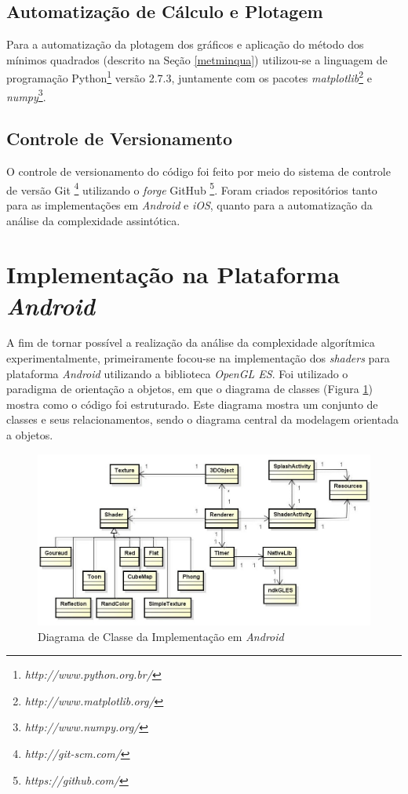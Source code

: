 \subsection{Automatização de Cálculo e Plotagem}

	Para a automatização da plotagem dos gráficos e aplicação do método dos mínimos quadrados (descrito na Seção \ref{metminqua}) utilizou-se a linguagem de programação Python\footnote{\textit{http://www.python.org.br/}} versão 2.7.3, juntamente com os pacotes  \textit{matplotlib}\footnote{\textit{http://www.matplotlib.org/}} e  \textit{numpy}\footnote{\textit{http://www.numpy.org/}}. 

\subsection{Controle de Versionamento}

	O controle de versionamento do código foi feito por meio do sistema de controle de versão Git \footnote{\textit{http://git-scm.com/}} utilizando o \textit{forge} GitHub \footnote{\textit{https://github.com/}}. Foram criados repositórios tanto para as implementações em \textit{Android} e \textit{iOS}, quanto para a automatização da análise da complexidade assintótica.

\section{Implementação na Plataforma \textit{Android}} 
\label{imp}

	 A fim de tornar possível a realização da análise da complexidade algorítmica experimentalmente, primeiramente focou-se na implementação dos \textit{shaders} para plataforma \textit{Android} utilizando a biblioteca \textit{OpenGL ES}. Foi utilizado  o paradigma de orientação a objetos, em que o diagrama de classes (Figura \ref{class_diagram}) mostra como o código foi estruturado. Este diagrama mostra um conjunto de classes e seus relacionamentos, sendo o diagrama central da modelagem orientada a objetos. 

	\begin{figure}[ht]
	\centering
		\includegraphics[keepaspectratio=true,scale=0.5]{figuras/class_diagram.jpg}
	\caption{Diagrama de Classe da Implementação em \textit{Android}}
	\label{class_diagram}
	\end{figure}

